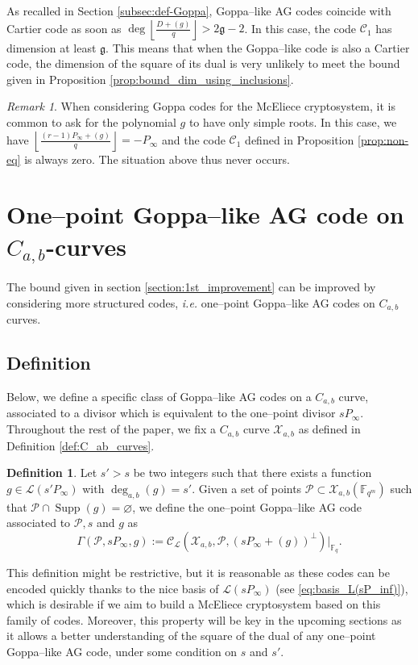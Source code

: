 \documentclass[a4paper]{article}
\theoremstyle{definition}
\newtheorem{definition}[thm]{Definition}
\theoremstyle{remark}
\newtheorem{remark}[thm]{Remark}
\newcommand{\calP}{\mathcal{P}}
\newcommand{\calL}{\mathcal{L}}
\newcommand{\calC}{\mathcal{C}}
\newcommand{\calX}{\mathcal{X}}
\newcommand{\fq}{\mathbb{F}_{q}}
\newcommand{\F}{\mathbb{F}}
\newcommand{\Supp}{\operatorname{Supp}}
\newcommand{\degab}[1]{\deg_{a,b}\left(#1\right)}
\begin{document}
As recalled in Section \ref{subsec:def-Goppa}, Goppa--like AG codes coincide with Cartier code as soon as $\deg \left\lfloor \frac{D+(g)}{q} \right\rfloor > 2 \mathfrak{g}-2$. In this case, the code $\calC_1$ has dimension at least $\mathfrak{g}$. This means that when the Goppa--like code is also a Cartier code, the dimension of the square of its dual is very unlikely to meet the bound given in Proposition \ref{prop:bound_dim_using_inclusions}.

\begin{remark}
	When considering Goppa codes for the McEliece cryptosystem, it is common to ask for the polynomial $g$ to have only simple roots. In this case, we have $ \left\lfloor \frac{(r-1)P_\infty+(g)}{q} \right\rfloor = -P_\infty$ and the code $\calC_1$ defined in Proposition \ref{prop:non-eq} is always zero. The situation above thus never occurs.
\end{remark}

\section{One--point Goppa--like AG code on $C_{a,b}$-curves}\label{sec:AG-C_a,b}
The bound given in section \ref{section:1st_improvement} can be improved by considering more structured codes, \emph{i.e.} one--point Goppa--like AG codes on $C_{a,b}$ curves.
\subsection{Definition}

Below, we define a specific class of Goppa--like AG codes on a $C_{a,b}$ curve, associated to a divisor which is equivalent to the one--point divisor $sP_\infty$. 
\noindent Throughout the rest of the paper, we fix a $C_{a,b}$ curve $\calX_{a,b}$ as defined in Definition \ref{def:C_ab_curves}.
\begin{definition} \label{def:one--point_Goppa--like_AG_codes_on_C_a,b_curves}
Let $s'>s$ be two integers such that there exists a function $g \in \calL(s'P_\infty)$ with $\degab{g}=s'$. Given a set of points  $\calP \subset \calX_{a,b}(\F_{q^m})$ such that $\calP \cap \Supp(g) = \varnothing$, we define the one--point Goppa--like AG code associated to $\calP,s$ and $g$ as 
\[\Gamma(\calP,sP_\infty,g) := \calC_{\calL}(\calX_{a,b},\calP,(sP_\infty+(g))^{\perp})|_{\fq}.\]
\end{definition}
This definition might be restrictive, but it is reasonable as these codes can be encoded quickly thanks to the nice basis of $\calL(sP_\infty)$ (see \eqref{eq:basis_L(sP_inf)}), which is desirable if we aim to build a McEliece cryptosystem based on this family of codes. Moreover, this property will be key in the upcoming sections as it allows a better understanding of the square of the dual of any one--point Goppa--like AG code, under some condition on $s$ and $s'$. \\
\end{document}

